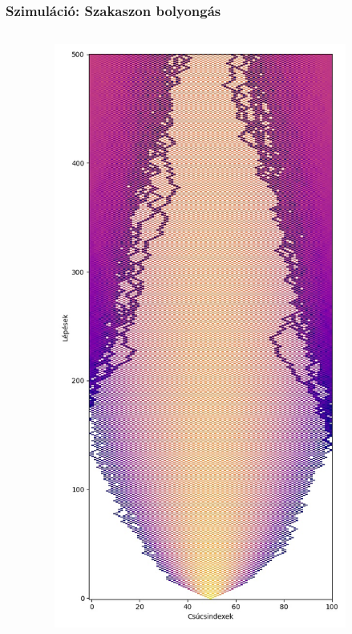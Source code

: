 \documentclass[aspectratio=169]{beamer}
\begin{document}
\begin{frame}
  \frametitle{Szimuláció: Szakaszon bolyongás}

  \begin{columns}[onlytextwidth]
    \begin{column}{.25\textwidth}
    \end{column}
    \begin{column}{.25\textwidth}
      \begin{figure}
        \includegraphics[width=0.9\textwidth]{./figures/classical_simulation_long.jpg}

\end{figure}
\end{column}
\end{columns}
\end{frame}
\end{document}
